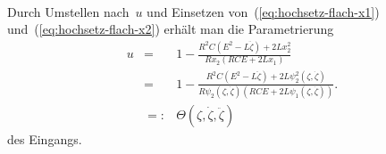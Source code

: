 \begin{example}
\begin{equation}
\begin{array}{rcl}
\end{array}\label{eq:hochsetz-ddy}
\end{equation}
Durch Umstellen nach~$u$ und Einsetzen von~(\ref{eq:hochsetz-flach-x1})
und~(\ref{eq:hochsetz-flach-x2}) erhält man die Parametrierung
\[
\begin{array}{cll}
u & = & 1-\frac{R^{2}C\left(E^{2}-L\ddot{\zeta}\right)+2Lx_{2}^{2}}{Rx_{2}\left(RCE+2Lx_{1}\right)}\\
 & = & 1-\frac{R^{2}C\left(E^{2}-L\ddot{\zeta}\right)+2L\psi_{2}^{2}(\zeta,\dot{\zeta})}{R\psi_{2}(\zeta,\dot{\zeta})\left(RCE+2L\psi_{1}(\zeta,\dot{\zeta})\right)}.\\
 & =: & \Theta(\zeta,\dot{\zeta},\ddot{\zeta})
\end{array}
\]
des Eingangs.
\end{example}

